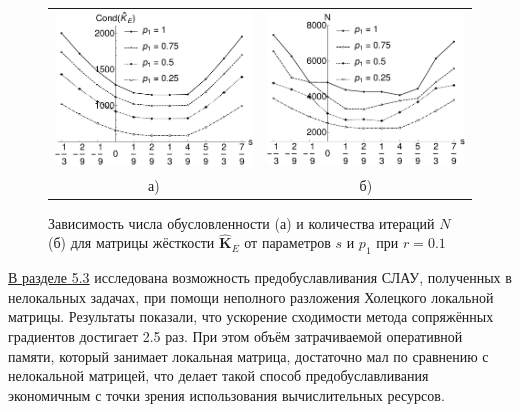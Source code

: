 \begin{figure}[ht] \centering
	\begin{tabular}{cc}
		\includegraphics[width=0.38\linewidth]{pics/MechanicalCond.pdf} &
		\includegraphics[width=0.38\linewidth]{pics/MechanicalIter.pdf} \\
		а) & б)
	\end{tabular}
    \caption{Зависимость числа обусловленности (а) и количества итераций $N$ (б) для матрицы жёсткости $\widehat{\textbf{K}}_E$ от параметров $s$ и $p_1$ при $r = 0.1$}
    \label{fig:MechanicalCondAndIter}
\end{figure}


\underline{В разделе 5.3} исследована возможность предобуславливания СЛАУ, полученных в нелокальных задачах, при помощи неполного разложения Холецкого локальной матрицы. Результаты показали, что ускорение сходимости  метода сопряжённых градиентов достигает 2.5 раз. При этом объём затрачиваемой оперативной памяти, который занимает локальная матрица, достаточно мал по сравнению с нелокальной матрицей, что делает такой способ предобуславливания экономичным с точки зрения использования вычислительных ресурсов.

